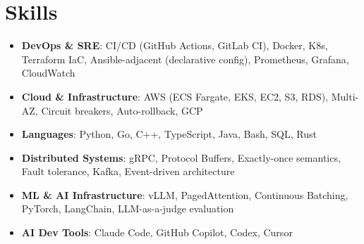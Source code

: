 \documentclass[letterpaper,11pt]{article}
\newcommand{\resumeSubHeadingListStart}{\begin{itemize}[leftmargin=0.15in, label={}]}
\newcommand{\resumeSubHeadingListEnd}{\end{itemize}}
\newcommand{\resumeSkillHeading}[2]{%
  \item\small{\textbf{#1}: #2 \vspace{-9pt}}%
}
\begin{document}
\section{Skills}
  \resumeSubHeadingListStart
    \resumeSkillHeading{DevOps \& SRE}{CI/CD (GitHub Actions, GitLab CI), Docker, K8s, Terraform IaC, Ansible-adjacent (declarative config), Prometheus, Grafana, CloudWatch}
    \resumeSkillHeading{Cloud \& Infrastructure}{AWS (ECS Fargate, EKS, EC2, S3, RDS), Multi-AZ, Circuit breakers, Auto-rollback, GCP}
    \resumeSkillHeading{Languages}{Python, Go, C++, TypeScript, Java, Bash, SQL, Rust}
    \resumeSkillHeading{Distributed Systems}{gRPC, Protocol Buffers, Exactly-once semantics, Fault tolerance, Kafka, Event-driven architecture}
    \resumeSkillHeading{ML \& AI Infrastructure}{vLLM, PagedAttention, Continuous Batching, PyTorch, LangChain, LLM-as-a-judge evaluation}
    \resumeSkillHeading{AI Dev Tools}{Claude Code, GitHub Copilot, Codex, Cursor}
  \resumeSubHeadingListEnd
\end{document}
